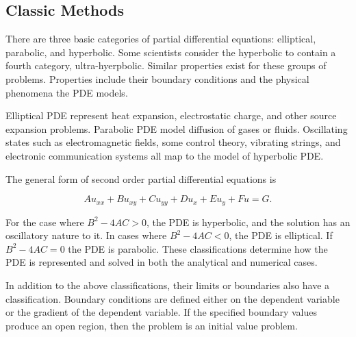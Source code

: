 \subsection {Classic Methods}
There are three basic %
categories of partial differential equations: elliptical, parabolic, and hyperbolic.  Some scientists consider the hyperbolic to %
contain a fourth category, ultra-hyerpbolic.  %
Similar properties exist for these groups of problems.  Properties include their boundary conditions and the physical phenomena the PDE models.  %

Elliptical PDE represent %
heat expansion, electrostatic charge, and other source expansion problems.  Parabolic PDE model diffusion of gases or fluids.  Oscillating states such as electromagnetic fields, some control theory, vibrating strings, and electronic communication systems all map to the model of hyperbolic PDE.%

The general form of second order partial differential equations is %

\begin {equation}
Au_{xx} + Bu_{xy} +Cu_{yy} +Du_{x} + Eu_{y} + Fu = G
.
\end {equation}


For the case where $B^2 - 4AC > 0 $, %
the PDE is hyperbolic, and the solution has an oscillatory nature to it.  In cases where  $B^2 - 4AC < 0 $,  %
the PDE is elliptical.  If $B^2-4AC =  0$ %
the PDE is parabolic.  These classifications determine how the PDE is represented and solved in both the analytical and numerical cases.  %


In addition to the above classifications, %
their limits or boundaries also have a classification.   Boundary conditions are defined either on the dependent variable or the gradient of the dependent variable.  If %
the specified boundary values produce an open region,  %
then the problem is an initial value problem.   %


